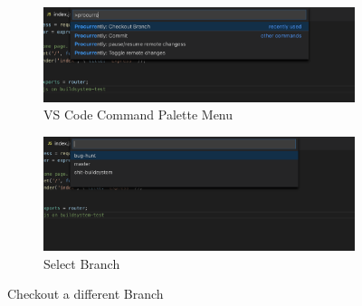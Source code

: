 \begin{figure}[h]
    \begin{subfigure}{.5\textwidth}
        \centering
        \includegraphics[width=1\linewidth]{figures/screenshots/scenarios/1checkout_branch.png}
        \caption{VS Code Command Palette Menu}
        \label{fig:1checkout_branch_palette}
    \end{subfigure}
    \begin{subfigure}{.5\textwidth}
        \centering
        \includegraphics[width=1\linewidth]{figures/screenshots/scenarios/1checkout_bughunt.png}
        \caption{Select Branch}
        \label{fig:1checkout_bughunt}
    \end{subfigure}
    \caption{Checkout a different Branch}
\end{figure}

